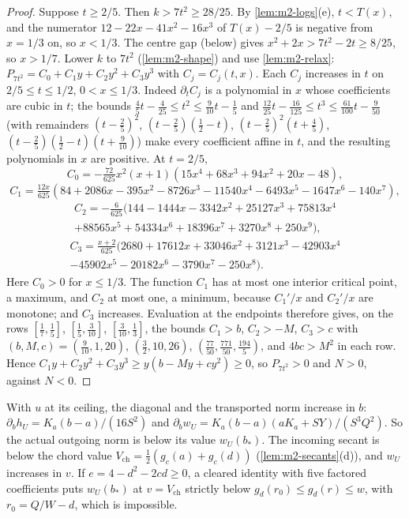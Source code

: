 \begin{proof}
Suppose $t\ge2/5$. Then $k>7t^2\ge28/25$. By \cref{lem:m2-logs}(e), $t<T(x)$, and the numerator
$12-22x-41x^2-16x^3$ of $T(x)-2/5$ is negative from $x=1/3$ on, so $x<1/3$. The centre gap (below)
gives $x^2+2x>7t^2-2t\ge8/25$, so $x>1/7$. Lower $k$ to $7t^2$ (\cref{lem:m2-shape}) and use
\cref{lem:m2-relax}: $P_{7t^2}=C_0+C_1y+C_2y^2+C_3y^3$ with $C_j=C_j(t,x)$. Each $C_j$ increases in
$t$ on $2/5\le t\le1/2$, $0<x\le1/3$. Indeed $\partial_tC_j$ is a polynomial in $x$ whose
coefficients are cubic in $t$; the bounds $\frac45t-\frac4{25}\le t^2\le\frac9{10}t-\frac15$ and
$\frac{12}{25}t-\frac{16}{125}\le t^3\le\frac{61}{100}t-\frac9{50}$ (with remainders $(t-\frac25)^2$,
$(t-\frac25)(\frac12-t)$, $(t-\frac25)^2(t+\frac45)$, $(t-\frac25)(\frac12-t)(t+\frac9{10})$) make every
coefficient affine in $t$, and the resulting polynomials in $x$ are positive. At $t=2/5$,
\[
C_0=-\tfrac{72}{625}x^2(x+1)(15x^4+68x^3+94x^2+20x-48),
\]
\[
C_1=\tfrac{12x}{625}(84+2086x-395x^2-8726x^3-11540x^4-6493x^5-1647x^6-140x^7),
\]
\begin{multline*}
C_2=-\tfrac6{625}(144-1444x-3342x^2+25127x^3+75813x^4\\
+88565x^5+54334x^6+18396x^7+3270x^8+250x^9),
\end{multline*}
\begin{multline*}
C_3=\tfrac{x+2}{625}(2680+17612x+33046x^2+3121x^3-42903x^4\\
-45902x^5-20182x^6-3790x^7-250x^8).
\end{multline*}
Here $C_0>0$ for $x\le1/3$. The function $C_1$ has at most one interior critical point, a maximum,
and $C_2$ at most one, a minimum, because $C_1'/x$ and $C_2'/x$ are monotone; and $C_3$ increases.
Evaluation at the endpoints therefore gives, on the rows $[\frac17,\frac15]$, $[\frac15,\frac3{10}]$,
$[\frac3{10},\frac13]$, the bounds $C_1>b$, $C_2>-M$, $C_3>c$ with
$(b,M,c)=(\frac9{10},1,20)$, $(\frac32,10,26)$, $(\frac{77}{50},\frac{771}{50},\frac{194}5)$, and
$4bc>M^2$ in each row. Hence $C_1y+C_2y^2+C_3y^3\ge y(b-My+cy^2)\ge0$, so $P_{7t^2}>0$ and $N>0$,
against $N<0$.
\end{proof}

 With $u$ at its ceiling, the diagonal and the transported norm
increase in $b$: $\partial_bh_U=K_a(b-a)/(16S^2)$ and $\partial_bw_U=K_a(b-a)(aK_a+SY)/(S^3Q^2)$. So
the actual outgoing norm is below its value $w_U(b_*)$. The incoming secant is below the chord
value $V_{\mathrm{ch}}=\frac12(g_c(a)+g_c(d))$ (\cref{lem:m2-secants}(d)), and $w_U$ increases in
$v$. If $e=4-d^2-2cd\ge0$, a cleared identity with five factored coefficients puts $w_U(b_*)$ at
$v=V_{\mathrm{ch}}$ strictly below $g_d(r_0)\le g_d(r)\le w$, with $r_0=Q/W-d$, which is impossible.


